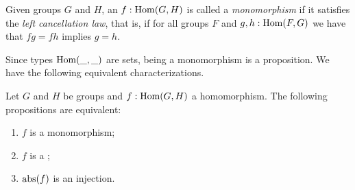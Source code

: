\begin{definition}\label{def:monomorphism}
Given groups $G$ and $H$, an $f: \mathrm{Hom}(G,H)$ is called a 
\emph{monomorphism} if it satisfies the \emph{left cancellation law}, 
that is, if for all groups $F$ and $g,h:\mathrm{Hom}(F,G)$ we have that $fg=fh$ implies $g=h$.
\end{definition}

Since types $\mathrm{Hom}(\_,\_)$ are sets, being a monomorphism is a proposition.
We have the following equivalent characterizations.

\begin{lemma}\label{lem:eq-mono-cover}
Let $G$ and $H$ be groups and $f: \mathrm{Hom}(G,H)$ a homomorphism.
The following propositions are equivalent: %
\begin{enumerate}
\item\label{it:mono} $f$ is a monomorphism;
\item\label{it:cover} $f$ is a \covering;
\item\label{it:injection} $\mathrm{abs}(f)$ is an injection.
\end{enumerate}
\end{lemma}

